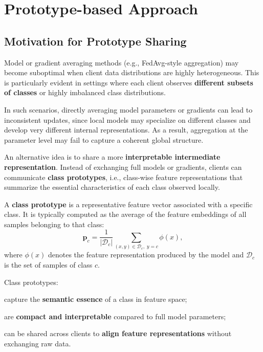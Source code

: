 \section{Prototype-based Approach}

\subsection{Motivation for Prototype Sharing}

Model or gradient averaging methods (e.g., FedAvg-style aggregation) may become suboptimal
when client data distributions are highly heterogeneous. This is particularly evident in
settings where each client observes \textbf{different subsets of classes} or highly
imbalanced class distributions.

In such scenarios, directly averaging model parameters or gradients can lead to
inconsistent updates, since local models may specialize on different classes and develop
very different internal representations. As a result, aggregation at the parameter level
may fail to capture a coherent global structure.

An alternative idea is to share a more \textbf{interpretable intermediate
representation}. Instead of exchanging full models or gradients, clients can communicate
\textbf{class prototypes}, i.e., class-wise feature representations that summarize the
essential characteristics of each class observed locally.

\begin{infobox}
    A \textbf{class prototype} is a representative feature vector associated with a specific
    class. It is typically computed as the average of the feature embeddings of all samples
    belonging to that class:
    \[
    \mathbf{p}_c
    =
    \frac{1}{|\mathcal{D}_c|}
    \sum_{(x,y)\in\mathcal{D}_c,\; y=c}
    \phi(x),
    \]
    where $\phi(x)$ denotes the feature representation produced by the model and
    $\mathcal{D}_c$ is the set of samples of class $c$.
    
    Class prototypes:
    \begin{compactitemize}
        \item capture the \textbf{semantic essence} of a class in feature space;
        \item are \textbf{compact and interpretable} compared to full model parameters;
        \item can be shared across clients to \textbf{align feature representations} without
        exchanging raw data.
    \end{compactitemize}
\end{infobox}


